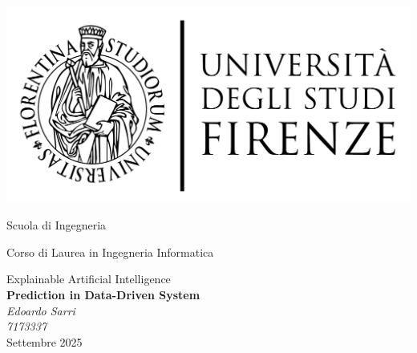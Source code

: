 \newcommand{\scuola}{
	{\fontsize{18pt}{\baselineskip}\selectfont Scuola di Ingegneria}}
\newcommand{\corso}{
    {\fontsize{16pt}{\baselineskip}\selectfont Corso di Laurea in Ingegneria Informatica}}
\newcommand{\lezione}{
	{\fontsize{14pt}{\baselineskip}\selectfont Explainable Artificial Intelligence}}

\begin{titlepage}
    \centering
    \vspace{1cm}
    \includegraphics[scale=0.3]{images/logo UniFi.pdf} \\
    \vspace{1cm}
    \scuola \\
    \vspace{0.5cm}
    \corso \\
    \vspace{0.5cm}
    \lezione \\
    \vspace{4cm}
    {\Huge\bfseries Prediction in Data-Driven System} \\
    \vspace{2cm}
    {\Large\itshape Edoardo Sarri} \\
    \vspace{0.5cm}
    {\Large\itshape 7173337} \\
    \vfill
    {\fontsize{16pt}{\baselineskip}\selectfont Settembre 2025}
\end{titlepage}